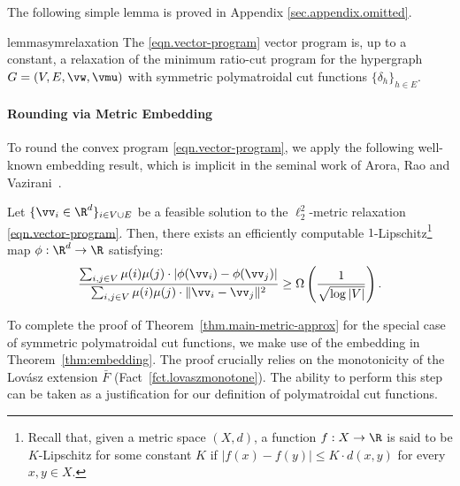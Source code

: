 \documentclass[letterpaper]{article}
\begin{document}
The following simple lemma is proved in Appendix \ref{sec.appendix.omitted}.

\begin{restatable}{lemma}{symrelaxation}
\label{lem.relaxation}
The \eqref{eqn.vector-program} vector program is, up to a constant, a relaxation of the minimum ratio-cut program for the hypergraph $G=(V,E,\vw,\vmu)$ with symmetric polymatroidal cut functions $\{\delta_h\}_{h \in E}.$
\end{restatable}

\paragraph{Rounding via Metric Embedding} To round the convex program \eqref{eqn.vector-program}, we apply the following well-known embedding result, which is implicit in the seminal work of Arora, Rao and Vazirani~\cite{ARV2009}.

\begin{theorem}
\label{thm:embedding}
Let $\{\vv_i \in \R^d \}_{i \in V \cup E}$ be a feasible solution to the $\ell_2^2$-metric relaxation \eqref{eqn.vector-program}. Then, there exists an efficiently computable $1$-Lipschitz\footnote{Recall that, given a metric space $(X,d)$, a function $f:X \to \R $ is said to be $K$-Lipschitz for some constant $K$ if $|f(x) - f(y)| \leq K\cdot d(x,y)$ for every $x,y \in X$.} map $\phi:\R^d \to \R$ satisfying:
$$
  \frac{\sum_{i, j \in V} \mu(i) \mu(j) \cdot |\phi(\vv_i)- \phi(\vv_j)|}
  {\sum_{i, j \in V} \mu(i) \mu(j) \cdot \|\vv_i - \vv_j\|^2}
  \geq \Omega \left(\frac{1}{\sqrt{\log |V|}}\right).
$$
\end{theorem}

To complete the proof of Theorem~\ref{thm.main-metric-approx} for the special case of symmetric polymatroidal cut functions, we make use of the embedding in Theorem~\ref{thm:embedding}. The proof crucially relies on the monotonicity of the Lov\'asz extension $\bar{F}$ (Fact~\ref{fct.lovaszmonotone}). The ability to perform this step can be taken as a justification for our definition of polymatroidal cut functions.
\end{document}

